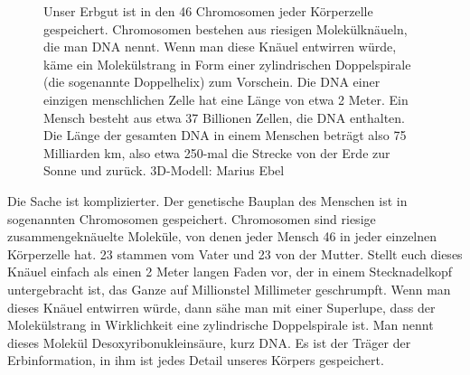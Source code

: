 \documentclass[fontsize=14pt,a4paper,headinclude,DIV=calc,automark]{scrbook}
\begin{document}
\setlength{\fboxsep}{0pt}    %
\setlength{\fboxrule}{0.2pt} %
\begin{figure}[H]
    \centering
    \caption{Unser Erbgut ist in den 46 Chromosomen jeder Körperzelle gespeichert. Chromosomen bestehen aus riesigen Molekülknäueln, die man DNA nennt. Wenn man diese Knäuel entwirren würde, käme ein Molekülstrang in Form einer zylindrischen Doppelspirale (die sogenannte Doppelhelix) zum Vorschein. Die DNA einer einzigen menschlichen Zelle hat eine Länge von etwa 2 Meter. Ein Mensch besteht aus etwa 37 Billionen Zellen, die DNA enthalten. Die Länge der gesamten DNA in einem Menschen beträgt also 75 Milliarden km, also etwa 250-mal die Strecke von der Erde zur Sonne und zurück. 3D-Modell: Marius Ebel}
    \label{fig:erbgut}
\end{figure}

Die Sache ist komplizierter. Der genetische Bauplan des Menschen ist in sogenannten Chromosomen gespeichert. Chromosomen sind riesige zusammengeknäuelte Moleküle, von denen jeder Mensch 46 in jeder einzelnen Körperzelle hat. 23 stammen vom Vater und 23 von der Mutter. Stellt euch dieses Knäuel einfach als einen 2 Meter langen Faden vor, der in einem Stecknadelkopf untergebracht ist, das Ganze auf Millionstel Millimeter geschrumpft. Wenn man dieses Knäuel entwirren würde, dann sähe man mit einer Superlupe, dass der Molekülstrang in Wirklichkeit eine zylindrische Doppelspirale ist. Man nennt dieses Molekül Desoxyribonukleinsäure, kurz DNA. Es ist der Träger der Erbinformation, in ihm ist jedes Detail unseres Körpers gespeichert.
\end{document}
